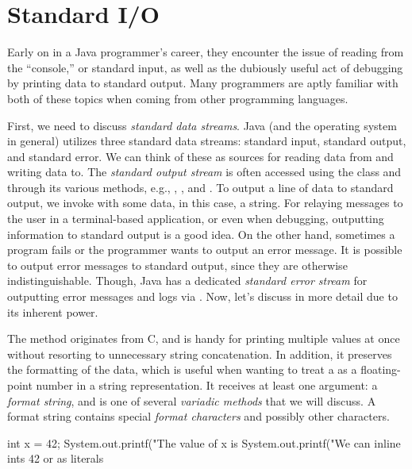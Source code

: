 \section{Standard I/O}
Early on in a Java programmer's career, they encounter the issue of reading from the ``console,'' or standard input, as well as the dubiously useful act of debugging by printing data to standard output. 
Many programmers are aptly familiar with both of these topics when coming from other programming languages.

First, we need to discuss \emph{standard data streams}. Java (and the operating system in general) utilizes three standard data streams: standard input, standard output, and standard error. 
We can think of these as sources for reading data from and writing data to. 
The \emph{standard output stream} is often accessed using the  class and through its various methods, e.g., , , and . 
To output a line of data to standard output, we invoke  with some data, in this case, a string.
For relaying messages to the user in a terminal-based application, or even when debugging, outputting information to standard output is a good idea. 
On the other hand, sometimes a program fails or the programmer wants to output an error message. 
It is possible to output error messages to standard output, since they are otherwise indistinguishable. 
Though, Java has a dedicated \emph{standard error stream} for outputting error messages and logs via . 
Now, let's discuss  in more detail due to its inherent power.

The  method originates from C, and is handy for printing multiple values at once without resorting to unnecessary string concatenation. 
In addition, it preserves the formatting of the data, which is useful when wanting to treat a  as a floating-point number in a string representation. 
It receives at least one argument: a \emph{format string}, and is one of several \emph{variadic methods} that we will discuss. A format string contains special \emph{format characters} and possibly other characters. 

\begin{verbnobox}[\small]
int x = 42;
System.out.printf("The value of x is %
System.out.printf("We can inline ints 42 or as literals %
\end{verbnobox}

